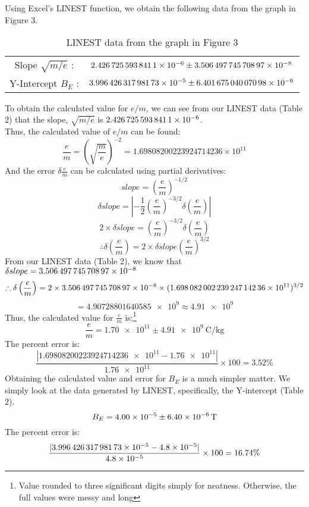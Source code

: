\documentclass[letterpaper]{article}
\begin{document}

\newpage
\noindent Using Excel's LINEST function, we obtain the following data from the graph in Figure 3.
\begin{table}[H]
\centering
\begin{tabular}{cc}
  Slope $\sqrt{m/e}$ : &  $\num{2.4267255938411E-06}\pm \num{3.50649774570897E-08}$ \\
  Y-Intercept $B_E$   :&  $\num{3.99642631798173E-05}\pm \num{6.40167504007098E-06}$ \\
\end{tabular}
\caption{LINEST data from the graph in Figure 3}
\end{table}

\noindent To obtain the calculated value for $e/m$, we can see from our LINEST data (Table 2) that the slope, $\sqrt{m/e}$ is
$\num{2.4267255938411E-06}$.\\
Thus, the calculated value of $e/m$ can be found:
$$ \frac{e}{m} = \left(\sqrt{\frac{m}{e}}\right)^{-2} = 1.69808200223924714236 \times 10^{11} $$
And the error $\delta \frac{e}{m}$ can be calculated using partial derivatives:
$$slope= \left(\frac{e}{m}\right)^{-1/2}$$
$$\delta slope = \left| -\frac{1}{2} \left(\frac{e}{m}\right)^{-3/2} \delta \left(\frac{e}{m}\right)\right|$$
$$ 2 \times \delta slope = \left(\frac{e}{m}\right)^{-3/2} \delta \left(\frac{e}{m}\right) $$
$$ \therefore \delta \left(\frac{e}{m}\right) = 2 \times \delta slope \left(\frac{e}{m}\right)^{3/2}$$
From our LINEST data (Table 2), we know that $\delta slope = \num{3.50649774570897E-08} $
$$ \therefore \delta \left(\frac{e}{m}\right) = 2 \times \num{3.50649774570897E-08} \times (\num{1.69808200223924714236e11})^{3/2}$$
$$= \num{4.90728801640585e9} \approx \num{4.91e9}$$
Thus, the calculated value for $\frac{e}{m}$ is:\footnote{Value rounded to three significant digits simply for neatness. Otherwise, the full values were messy and long}
$$\frac{e}{m}=\num{1.70e11} \pm \SI{4.91e9}{\coulomb\per\kilogram}$$
The percent error is:
$$ \frac{|\num{1.69808200223924714236e11}-\num{1.76e11}|}{\num{1.76e11}}\times100 = 3.52\%$$
Obtaining the calculated value and error for $B_E$ is a much simpler matter. We simply
look at the data generated by LINEST, specifically, the Y-intercept (Table 2).
$$B_E = \num{4.00E-05}\pm \SI{6.40E-06}{\tesla}$$
The percent error is:
$$ \frac{|\num{3.99642631798173E-05}-\num{4.8e-5}|}{\num{4.8e-5}}\times100 = 16.74\%$$
\end{document}
